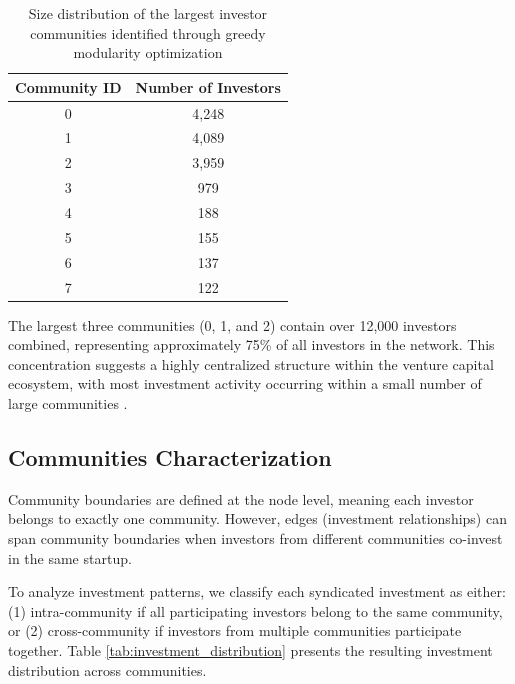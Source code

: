 
\begin{table}[htp]
\centering
\begin{tabular}{|c|c|}
\hline
\textbf{Community ID} & \textbf{Number of Investors} \\
\hline
0 & 4,248 \\
1 & 4,089 \\
2 & 3,959 \\
3 & 979 \\
4 & 188 \\
5 & 155 \\
6 & 137 \\
7 & 122 \\
\hline
\end{tabular}
\caption{Size distribution of the largest investor communities identified through greedy modularity optimization}
\label{tab:community_sizes}
\end{table}

The largest three communities (0, 1, and 2) contain over 12,000 investors combined, representing approximately 75\% of all investors in the network. This concentration suggests a highly centralized structure within the venture capital ecosystem, with most investment activity occurring within a small number of large communities \cite{Borgatti2011}. 




\subsection{Communities Characterization}

Community boundaries are defined at the node level, meaning each investor belongs to exactly one community. However, edges (investment relationships) can span community boundaries when investors from different communities co-invest in the same startup.

To analyze investment patterns, we classify each syndicated investment as either: (1) intra-community if all participating investors belong to the same community, or (2) cross-community if investors from multiple communities participate together. Table \ref{tab:investment_distribution} presents the resulting investment distribution across communities.

